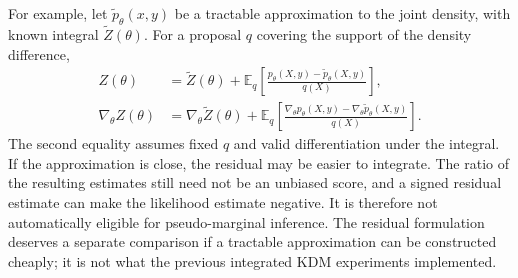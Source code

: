 For example, let $\widetilde p_\theta(x,y)$ be a tractable approximation to
the joint density, with known integral $\widetilde Z(\theta)$. For a proposal
$q$ covering the support of the density difference,
\begin{align}
 Z(\theta)&=\widetilde Z(\theta)
 +\mathbb E_q\!\left[
       \frac{p_\theta(X,y)-\widetilde p_\theta(X,y)}{q(X)}\right],\\
 \nabla_\theta Z(\theta)&=\nabla_\theta\widetilde Z(\theta)
 +\mathbb E_q\!\left[
       \frac{\nabla_\theta p_\theta(X,y)
             -\nabla_\theta\widetilde p_\theta(X,y)}{q(X)}\right].
 \label{eq:joint-surrogate-residual}
\end{align}
The second equality assumes fixed $q$ and valid differentiation under the
integral. If the approximation is close, the residual may be easier to
integrate. The ratio of the resulting estimates still need not be an unbiased
score, and a signed residual estimate can make the likelihood estimate
negative. It is therefore not automatically eligible for pseudo-marginal
inference. The residual formulation deserves a separate comparison if a
tractable approximation can be constructed cheaply; it is not what the
previous integrated KDM experiments implemented.
